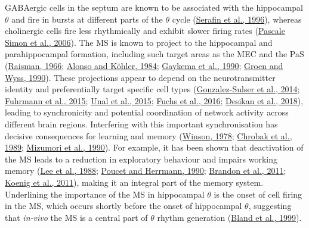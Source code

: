 \documentclass[
  12pt,
  a4paper,
  openany]{book}
\begin{document}
GABAergic cells in the septum are known to be associated with the hippocampal \(\theta\) and fire in bursts at different parts of the \(\theta\) cycle (\protect\hyperlink{ref-serafin_rhythmic_1996}{Serafin et al., 1996}), whereas cholinergic cells fire less rhythmically and exhibit slower firing rates (\protect\hyperlink{ref-pascale_simon_firing_2006}{Pascale Simon et al., 2006}). The MS is known to project to the hippocampal and parahippocampal formation, including such target areas as the MEC and the PaS (\protect\hyperlink{ref-raisman_connexions_1966}{Raisman, 1966}; \protect\hyperlink{ref-alonso_study_1984}{Alonso and Köhler, 1984}; \protect\hyperlink{ref-gaykema_cortical_1990}{Gaykema et al., 1990}; \protect\hyperlink{ref-van_groen_connections_1990}{Groen and Wyss, 1990}). These projections appear to depend on the neurotransmitter identity and preferentially target specific cell types (\protect\hyperlink{ref-gonzalez-sulser_gabaergic_2014}{Gonzalez-Sulser et al., 2014}; \protect\hyperlink{ref-fuhrmann_locomotion_2015}{Fuhrmann et al., 2015}; \protect\hyperlink{ref-unal_synaptic_2015}{Unal et al., 2015}; \protect\hyperlink{ref-fuchs_local_2016}{Fuchs et al., 2016}; \protect\hyperlink{ref-desikan_target_2018}{Desikan et al., 2018}), leading to synchronicity and potential coordination of network activity across different brain regions. Interfering with this important synchronisation has decisive consequences for learning and memory (\protect\hyperlink{ref-winson_loss_1978}{Winson, 1978}; \protect\hyperlink{ref-chrobak_intraseptal_1989}{Chrobak et al., 1989}; \protect\hyperlink{ref-mizumori_reversible_1990}{Mizumori et al., 1990}). For example, it has been shown that deactivation of the MS leads to a reduction in exploratory behaviour and impairs working memory (\protect\hyperlink{ref-lee_effects_1988}{Lee et al., 1988}; \protect\hyperlink{ref-poucet_septum_1990}{Poucet and Herrmann, 1990}; \protect\hyperlink{ref-brandon_reduction_2011}{Brandon et al., 2011}; \protect\hyperlink{ref-koenig_spatial_2011}{Koenig et al., 2011}), making it an integral part of the memory system. Underlining the importance of the MS in hippocampal \(\theta\) is the onset of cell firing in the MS, which occurs shortly before the onset of hippocampal \(\theta\), suggesting that \emph{in-vivo} the MS is a central part of \(\theta\) rhythm generation (\protect\hyperlink{ref-bland_mechanisms_1999}{Bland et al., 1999}).
\end{document}
